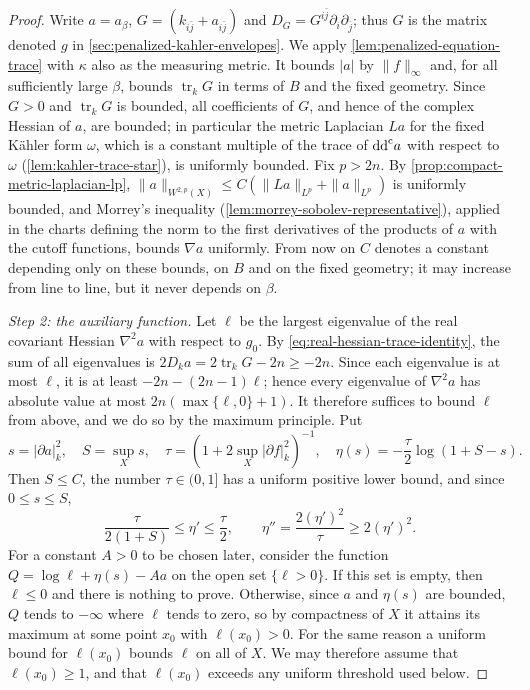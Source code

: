 \begin{proof}
Write $a=a_\beta$, $G=(k_{i\bar j}+a_{i\bar j})$ and $D_G=G^{i\bar j}\partial_i\partial_{\bar j}$; thus $G$ is the matrix denoted $g$ in \cref{sec:penalized-kahler-envelopes}. We apply \cref{lem:penalized-equation-trace} with $\kappa$ also as the measuring metric. It bounds $|a|$ by $\|f\|_\infty$ and, for all sufficiently large $\beta$, bounds $\operatorname{tr}_kG$ in terms of $B$ and the fixed geometry. Since $G>0$ and $\operatorname{tr}_kG$ is bounded, all coefficients of $G$, and hence of the complex Hessian of $a$, are bounded; in particular the metric Laplacian $La$ for the fixed K\"ahler form $\omega$, which is a constant multiple of the trace of $\mathrm{dd}^{\mathrm{c}} a$ with respect to $\omega$ (\cref{lem:kahler-trace-star}), is uniformly bounded. Fix $p>2n$. By \cref{prop:compact-metric-laplacian-lp}, $\|a\|_{W^{2,p}(X)}\leq C(\|La\|_{L^p}+\|a\|_{L^p})$ is uniformly bounded, and Morrey's inequality (\cref{lem:morrey-sobolev-representative}), applied in the charts defining the norm to the first derivatives of the products of $a$ with the cutoff functions, bounds $\nabla a$ uniformly. From now on $C$ denotes a constant depending only on these bounds, on $B$ and on the fixed geometry; it may increase from line to line, but it never depends on $\beta$.

\emph{Step 2: the auxiliary function.} Let $\ell$ be the largest eigenvalue of the real covariant Hessian $\nabla^2a$ with respect to $g_0$. By \eqref{eq:real-hessian-trace-identity}, the sum of all eigenvalues is $2D_ka=2\operatorname{tr}_kG-2n\geq-2n$. Since each eigenvalue is at most $\ell$, it is at least $-2n-(2n-1)\ell$; hence every eigenvalue of $\nabla^2a$ has absolute value at most $2n(\max\{\ell,0\}+1)$. It therefore suffices to bound $\ell$ from above, and we do so by the maximum principle. Put
\[
 s=|\partial a|_k^2,\quad S=\sup_Xs,\quad
 \tau=(1+2\sup_X|\partial f|_k^2)^{-1},\quad
 \eta(s)=-\frac\tau2\log(1+S-s).
\]
Then $S\leq C$, the number $\tau\in(0,1]$ has a uniform positive lower bound, and since $0\leq s\leq S$,
\begin{equation}\label{eq:real-hessian-gradient-weight}
 \frac{\tau}{2(1+S)}\leq\eta'\leq\frac\tau2,
 \qquad \eta''=\frac{2(\eta')^2}{\tau}\geq2(\eta')^2.
\end{equation}
For a constant $A>0$ to be chosen later, consider the function $Q=\log\ell+\eta(s)-Aa$ on the open set $\{\ell>0\}$. If this set is empty, then $\ell\leq0$ and there is nothing to prove. Otherwise, since $a$ and $\eta(s)$ are bounded, $Q$ tends to $-\infty$ where $\ell$ tends to zero, so by compactness of $X$ it attains its maximum at some point $x_0$ with $\ell(x_0)>0$. For the same reason a uniform bound for $\ell(x_0)$ bounds $\ell$ on all of $X$. We may therefore assume that $\ell(x_0)\geq1$, and that $\ell(x_0)$ exceeds any uniform threshold used below.


\end{proof}
